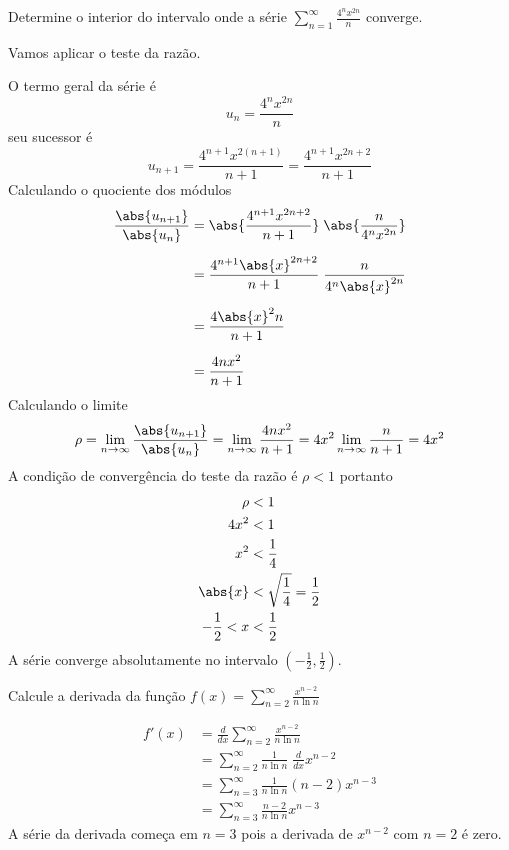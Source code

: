 \documentclass[a4paper,12pt,fleqn]{article}
\begin{document}
Determine o interior do intervalo onde a série
\(
  \sum_{n=1}^\infty \frac{4^nx^{2n}}{n}
\)
converge.

\begin{answer}
  Vamos aplicar o teste da razão.

  O termo geral da série é
  \[
    u_n = \frac{4^nx^{2n}}{n}
  \]
  seu sucessor é
  \[
    u_{n+1}
    = \frac{4^{n+1}x^{2(n+1)}}{n+1}
    = \frac{4^{n+1}x^{2n+2}}{n+1}
  \]
  Calculando o quociente dos módulos
  \begin{align*}
    \frac{\abs{u_{n+1}}}{\abs{u_n}}
    & = \abs{\frac{4^{n+1}x^{2n+2}}{n+1}} \; \abs{\frac{n}{4^nx^{2n}}} \\[2mm]
    & = \frac{4^{n+1}\abs{x}^{2n+2}}{n+1} \; \frac{n}{4^n\abs{x}^{2n}} \\[2mm]
    & = \frac{4\abs{x}^2n}{n+1} \\[2mm]
    & = \frac{4nx^2}{n+1}
  \end{align*}
  Calculando o limite
  \[
    \rho
    = \lim_{n\to\infty} \frac{\abs{u_{n+1}}}{\abs{u_n}}
    = \lim_{n\to\infty} \frac{4nx^2}{n+1}
    = 4x^2 \lim_{n\to\infty} \frac{n}{n+1}
    = 4x^2
  \]
  A condição de convergência do teste da razão é $\rho<1$ portanto
  \begin{align*}
    \rho & < 1 \\
    4x^2 & < 1 \\
    x^2 & < \frac{1}{4} \\
    \abs{x} & < \sqrt{\frac{1}{4}} = \frac{1}{2} \\
    -\frac{1}{2} < x & < \frac{1}{2}
  \end{align*}
  A série converge absolutamente no intervalo \(\left(-\frac{1}{2}, \frac{1}{2}\right)\).
  \clearpage
\end{answer}

Calcule a derivada da função
\(
  f(x) = \sum_{n=2}^\infty \frac{x^{n-2}}{n\ln n}
\)

\begin{answer}
  \begin{align*}
    f'(x)
    & = \frac{d}{dx} \sum_{n=2}^\infty \frac{x^{n-2}}{n\ln n} \\[2mm]
    & = \sum_{n=2}^\infty \frac{1}{n\ln n} \;\frac{d}{dx} x^{n-2} \\[2mm]
    & = \sum_{n=3}^\infty \frac{1}{n\ln n} (n-2)x^{n-3} \\[2mm]
    & = \sum_{n=3}^\infty \frac{n-2}{n\ln n} x^{n-3}
  \end{align*}
  A série da derivada começa em $n=3$ pois a derivada de $x^{n-2}$ com $n=2$
  é zero.
  \clearpage
\end{answer}
\end{document}
